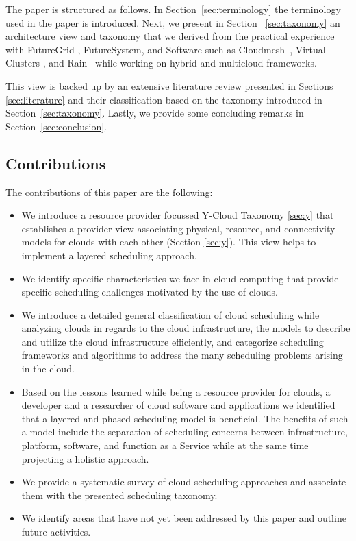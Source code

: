\documentclass[final,5p,times,twocolumn]{elsarticle}
\begin{document}
The paper is structured as follows. In Section~\ref{sec:terminology} the terminology used in the paper is introduced. Next, we present in Section ~\ref{sec:taxonomy} an architecture view and taxonomy that we derived from the practical experience with FutureGrid \cite{las12fg-bookchapter}, FutureSystem, and Software such as Cloudmesh~\cite{von2014accessing}, Virtual Clusters \cite{las-comet}, and Rain~\cite{las-fg-1295,las10dynamic,las-rain} while working on hybrid and multicloud frameworks.

This view is backed up by an extensive literature review presented in Sections \ref{sec:literature} and their classification based on the taxonomy introduced in Section~\ref{sec:taxonomy}. Lastly, we provide some concluding remarks in Section~\ref{sec:conclusion}.


\subsection{Contributions}

The contributions of this paper are the following:

\begin{itemize}
 
\item We introduce a resource provider focussed Y-Cloud Taxonomy \ref{sec:y} that establishes a provider view associating physical, resource, and connectivity models for clouds with each other (Section \ref{sec:y}). This view helps to implement a layered scheduling approach.

\item We identify specific characteristics we face in cloud computing that provide specific scheduling challenges motivated by the use of clouds.

\item We introduce a detailed general classification of cloud scheduling while analyzing clouds in regards to the cloud infrastructure, the models to describe and utilize the cloud infrastructure efficiently, and categorize scheduling frameworks and algorithms to address the many scheduling problems arising in the cloud.

\item Based on the lessons learned while being a resource provider for clouds, a developer and a researcher of cloud software and applications we identified that a layered and phased scheduling model is beneficial. The benefits of such a model include the separation of scheduling concerns between infrastructure, platform, software, and function as a Service while at the same time projecting a holistic approach.

\item We provide a systematic survey of cloud scheduling approaches and associate them with the presented scheduling taxonomy.

\item We identify areas that have not yet been addressed by this paper and outline future activities.
\end{itemize}
\end{document}
